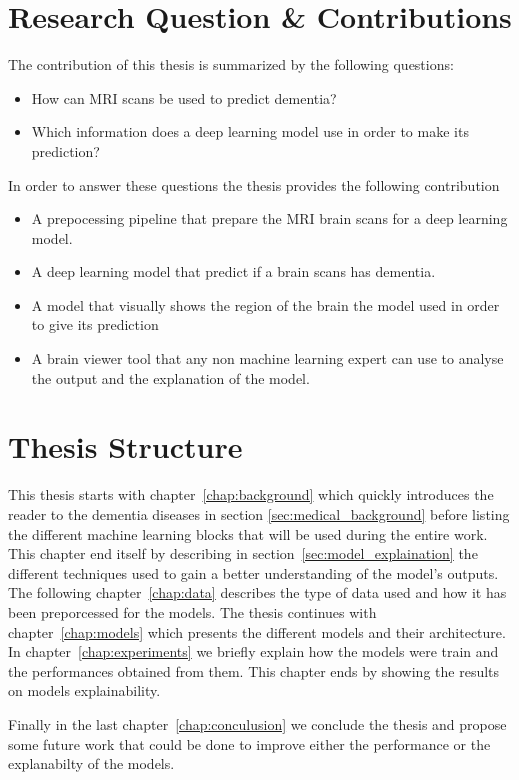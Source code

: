 \section{Research Question & Contributions}
The contribution of this thesis is summarized by the following questions:
\begin{itemize}
    \item How can MRI scans be used to predict dementia?
    \item Which information does a deep learning model use in order to make its prediction? 
\end{itemize}

In order to answer these questions the thesis provides the following contribution
\begin{itemize}
    \item A prepocessing pipeline that prepare the MRI brain scans for a deep learning model.
    \item A deep learning model that predict if a brain scans has dementia.
    \item A model that visually shows the region of the brain the model used in order to give its prediction
    \item A brain viewer tool that any non machine learning expert can use to analyse the output and the explanation of the model.  
\end{itemize}



\section{Thesis Structure}
\label{sec:structure}
This thesis starts with chapter~\ref{chap:background} which quickly introduces the reader to the dementia diseases in section \ref{sec:medical_background} before listing the different machine learning blocks that will be used during the entire work. This chapter end itself by describing in section~\ref{sec:model_explaination} the different techniques used to gain a better understanding of the model's outputs. The following chapter~\ref{chap:data} describes the type of data used and how it has been preporcessed for the models. The thesis continues with chapter~\ref{chap:models} which presents the different models and their architecture. 
In chapter~\ref{chap:experiments} we briefly explain how the models were train and the performances obtained from them. This chapter ends by showing the results on models explainability.

Finally in the last chapter~\ref{chap:conculusion} we conclude the thesis and propose some future work that could be done to improve either the performance or the explanabilty of the models.

